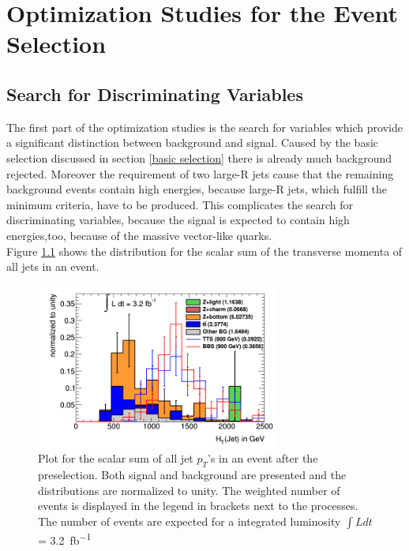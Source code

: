 \chapter{Optimization Studies for the Event Selection}

\section{Search for Discriminating Variables }
The first part of the optimization studies is the search for variables which provide a significant distinction between background and signal.
Caused by the basic selection discussed in section \ref{basic selection} there is already much background rejected.
Moreover the requirement of two large-R jets cause that the remaining background events contain high energies, because large-R jets, which fulfill the minimum criteria, have to be produced.
This complicates the search for discriminating variables, because the signal is expected to contain high energies,too, because of the massive vector-like quarks.\\
Figure \ref{H_T} shows the distribution for the scalar sum of the transverse momenta of all jets in an event.

\begin{figure}
\centering
\includegraphics[width=8cm]{figures/H_T.png}
\caption{Plot for the scalar sum of all jet $p_{T}$'s in an event after the preselection. 
Both signal and background are presented and the distributions are normalized to unity. 
The weighted number of events is displayed in the legend in brackets next to the processes. 
The number of events are expected for a integrated luminosity $\int L dt$ = \SI{3.2}{fb^{-1}}}
\label{H_T}
\end{figure}

